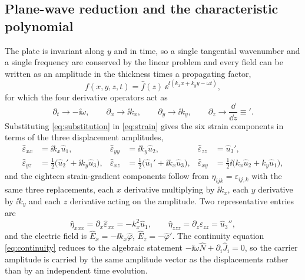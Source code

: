 \subsection{Plane-wave reduction and the characteristic polynomial}
\label{sec:governing_reduction}

The plate is invariant along $y$ and in time, so a single tangential wavenumber
and a single frequency are conserved by the linear problem and every field can be
written as an amplitude in the thickness times a propagating factor,
\begin{equation}
\label{eq:ansatz}
f(x,y,z,t)=\widehat f(z)\,\ee^{\ii(k_xx+k_yy-\omega t)} ,
\end{equation}
for which the four derivative operators act as
\begin{equation}
\label{eq:substitution}
\partial_t\to-\ii\omega,\qquad
\partial_x\to\ii k_x,\qquad
\partial_y\to\ii k_y,\qquad
\partial_z\to\frac{\dd}{\dd z}\equiv{}' .
\end{equation}
Substituting \eqref{eq:substitution} in \eqref{eq:strain} gives the six strain
components in terms of the three displacement amplitudes,
\begin{equation}
\label{eq:strain_amplitudes}
\begin{aligned}
\widehat\varepsilon_{xx}&=\ii k_x\widehat u_1, &
\widehat\varepsilon_{yy}&=\ii k_y\widehat u_2, &
\widehat\varepsilon_{zz}&=\widehat u_3',\\
\widehat\varepsilon_{yz}&=\tfrac12\bigl(\widehat u_2'+\ii k_y\widehat u_3\bigr),&
\widehat\varepsilon_{xz}&=\tfrac12\bigl(\widehat u_1'+\ii k_x\widehat u_3\bigr),&
\widehat\varepsilon_{xy}&=\tfrac12\ii\bigl(k_x\widehat u_2+k_y\widehat u_1\bigr),
\end{aligned}
\end{equation}
and the eighteen strain-gradient components follow from
$\eta_{ijk}=\varepsilon_{ij,k}$ with the same three replacements, each $x$
derivative multiplying by $\ii k_x$, each $y$ derivative by $\ii k_y$ and each
$z$ derivative acting on the amplitude.  Two representative entries are
\begin{equation}
\label{eq:eta_amplitudes}
\widehat\eta_{xxx}=\partial_x\widehat\varepsilon_{xx}=-k_x^{2}\widehat u_1,
\qquad
\widehat\eta_{zzz}=\partial_z\widehat\varepsilon_{zz}=\widehat u_3'',
\end{equation}
and the electric field is $\widehat E_x=-\ii k_x\widehat\varphi$,
$\widehat E_z=-\widehat\varphi'$.  The continuity equation
\eqref{eq:continuity} reduces to the algebraic statement
$-\ii\omega\widehat N+\partial_i\widehat J_i=0$, so the carrier amplitude is
carried by the same amplitude vector as the displacements rather than by an
independent time evolution.

